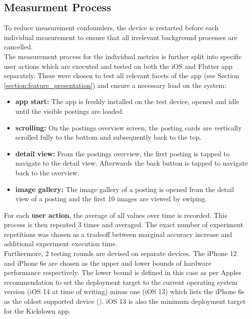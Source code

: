 \subsection{Measurment Process} \label{subsection::measurement_process}
To reduce measurement confounders, the device is restarted before each individual measurement to ensure that all
irrelevant background processes are cancelled.\\
The measurement process for the individual metrics is further split into specific user actions
which are executed and tested on both the iOS and Flutter app separately. These were chosen
to test all relevant facets of the app (see Section \ref{section:feature_presentation}) and ensure a necessary load on the system:
\begin{itemize}
    \item \textbf{app start:} The app is freshly installed on the test device, opened and idle until the visible postings are loaded.
    \item \textbf{scrolling:} On the postings overview screen, the posting cards are vertically scrolled fully to the bottom and subsequently back to the top.
    \item \textbf{detail view:} From the postings overview, the first posting is tapped to navigate to the detail view. Afterwards the back button is tapped to navigate back to the overview.
    \item \textbf{image gallery:} The image gallery of a posting is opened from the detail view of a posting and the first 10 images are viewed by swiping.
\end{itemize}
For each \textbf{user action}, the average of all values over time is recorded. This process is then
repeated 3 times and averaged. The exact number of experiment repetitions was chosen as a
tradeoff between marginal accuracy increase and additional experiment execution time.\\
Furthermore, 2 testing rounds are devised on separate devices. The iPhone 12 and iPhone
6s are chosen as the upper and lower bounds of hardware performance respectively. The lower
bound is defined in this case as per Apples recommendation to set the deployment target to the
current operating system version (iOS 14 at time of writing) minus one (iOS 13) which lists the
iPhone 6s as the oldest supported device (\cite{Apple2021}). iOS 13 is also the minimum deployment target for the Kickdown app.\\

